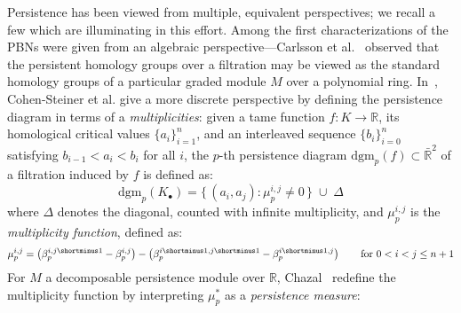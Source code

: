 \newcommand\restr[2]{{%
  \left.\kern-\nulldelimiterspace %
  #1 %
  \vphantom{\big|} %
  \right|_{#2} %
  }}
  

Persistence has been viewed from multiple, equivalent perspectives; we recall a few which are illuminating in this effort.
Among the first characterizations of the PBNs were given from an algebraic perspective---Carlsson et al.~\cite{zomorodian2004computing} observed that the persistent homology groups over a filtration may be viewed as the standard homology groups of a particular graded module $M$ over a polynomial ring. 
In~\cite{cohen2005stability}, Cohen-Steiner et al. give a more discrete perspective by defining the persistence diagram in terms of a \emph{multiplicities}: given a tame function $f: K \to \mathbb{R}$, its homological critical values $\{ a_i \}_{i=1}^n$, and an interleaved sequence $\{ b_i \}_{i=0}^n$ satisfying $b_{i-1} < a_i < b_i$ for all $i$, the $p$-th persistence diagram $\mathrm{dgm}_p(f) \subset \bar{\mathbb{R}}^2$ of a filtration induced by $f$ is defined as: 
\begin{equation}
\mathrm{dgm}_p(K_\bullet) = \{ \, (a_i, a_j) :  \mu_p^{i,j} \neq 0 \, \} \; \cup \; \Delta	
\end{equation}
where $\Delta$ denotes the diagonal, counted with infinite multiplicity, and $\mu_p^{i,j}$ is the  \emph{multiplicity function}, defined as: 
\begin{equation}\label{eq:multiplicity}
	\mu_p^{i,j} = \left(\beta_p^{i,j\shortminus1} - \beta_p^{i,j} \right) - \left(\beta_p^{i\shortminus1,j\shortminus1} - \beta_p^{i\shortminus1,j} \right) \quad\quad \text{for } 0 < i < j \leq n+ 1
\end{equation}
For $M$ a decomposable persistence module over $\mathbb{R}$, Chazal~\cite{chazal2016structure} redefine the multiplicity function by interpreting $\mu_p^\ast$ as a \emph{persistence measure}:
